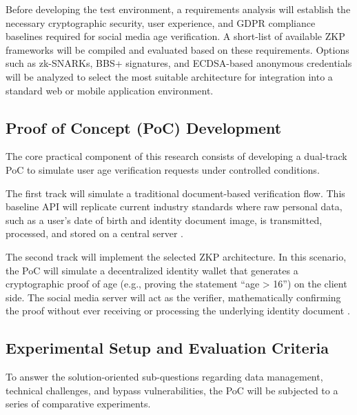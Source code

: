 \documentclass [english]{hogent-article}
\begin{document}
    Before developing the test environment, a requirements analysis will establish the necessary cryptographic security, user experience, and GDPR compliance baselines required for social media age verification. A short-list of available ZKP frameworks will be compiled and evaluated based on these requirements. Options such as zk-SNARKs, BBS+ signatures, and ECDSA-based anonymous credentials \autocite{EUCommission2025, Kesim2025} will be analyzed to select the most suitable architecture for integration into a standard web or mobile application environment.
    
    
    
    \subsection{Proof of Concept (PoC) Development}
    
    The core practical component of this research consists of developing a dual-track PoC to simulate user age verification requests under controlled conditions. 
    
    
    
    The first track will simulate a traditional document-based verification flow. This baseline API will replicate current industry standards where raw personal data, such as a user's date of birth and identity document image, is transmitted, processed, and stored on a central server \autocite{Signzy2026}. 
    
    
    
    The second track will implement the selected ZKP architecture. In this scenario, the PoC will simulate a decentralized identity wallet that generates a cryptographic proof of age (e.g., proving the statement ``age > 16'') on the client side. The social media server will act as the verifier, mathematically confirming the proof without ever receiving or processing the underlying identity document \autocite{Bootsma2025, Wodo2025}.
    
    
    
    \subsection{Experimental Setup and Evaluation Criteria}
    
    To answer the solution-oriented sub-questions regarding data management, technical challenges, and bypass vulnerabilities, the PoC will be subjected to a series of comparative experiments. 
    
\end{document}
